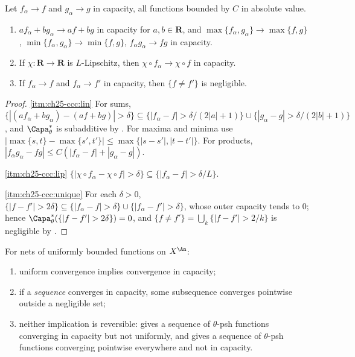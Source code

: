\begin{proposition}
\label{prop:ch25-capacity-convergence-calculus}
Let \(f_\alpha\to f\) and \(g_\alpha\to g\) in capacity, all functions
bounded by \(C\) in absolute value.
\begin{enumerate}
\item\label{itm:ch25-ccc:lin}
 \(af_\alpha+bg_\alpha\to af+bg\) in capacity for \(a,b\in\mathbf R\), and
 \(\max\{f_\alpha,g_\alpha\}\to\max\{f,g\}\),
 \(\min\{f_\alpha,g_\alpha\}\to\min\{f,g\}\),
 \(f_\alpha g_\alpha\to fg\) in capacity.
\item\label{itm:ch25-ccc:lip}
 If \(\chi:\mathbf R\to\mathbf R\) is \(L\)-Lipschitz, then
 \(\chi\circ f_\alpha\to\chi\circ f\) in capacity.
\item\label{itm:ch25-ccc:unique}
 If \(f_\alpha\to f\) and \(f_\alpha\to f'\) in capacity, then
 \(\{f\neq f'\}\) is negligible.
\end{enumerate}
\end{proposition}

\begin{proof}
\cref{itm:ch25-ccc:lin}  For sums, \(\{|(af_\alpha+bg_\alpha)-(af+bg)|
>\delta\}\subseteq\{|f_\alpha-f|>\delta/(2|a|+1)\}\cup
\{|g_\alpha-g|>\delta/(2|b|+1)\}\), and \(\Capa^*_\theta\) is subadditive by
.  For maxima and minima use
\(|\max\{s,t\}-\max\{s',t'\}|\leq\max\{|s-s'|,|t-t'|\}\).  For products,
\(|f_\alpha g_\alpha-fg|\leq C(|f_\alpha-f|+|g_\alpha-g|)\).

\cref{itm:ch25-ccc:lip}  \(\{|\chi\circ f_\alpha-\chi\circ f|>\delta\}
\subseteq\{|f_\alpha-f|>\delta/L\}\).

\cref{itm:ch25-ccc:unique}  For each \(\delta>0\),
\(\{|f-f'|>2\delta\}\subseteq\{|f_\alpha-f|>\delta\}\cup
\{|f_\alpha-f'|>\delta\}\), whose outer capacity tends to \(0\); hence
\(\Capa^*_\theta(\{|f-f'|>2\delta\})=0\), and
\(\{f\neq f'\}=\bigcup_k\{|f-f'|>2/k\}\) is negligible by
.
\end{proof}

\begin{proposition}
\label{prop:ch25-convergence-comparison}
For nets of uniformly bounded functions on \(X^{\An}\):
\begin{enumerate}
\item\label{itm:ch25-cc:unif}
 uniform convergence implies convergence in capacity;
\item\label{itm:ch25-cc:seq}
 if a \emph{sequence} converges in capacity, some subsequence converges
 pointwise outside a negligible set;
\item\label{itm:ch25-cc:none}
 neither implication is reversible: 
 gives a sequence of \(\theta\)-psh functions converging in capacity but not
 uniformly, and  gives a sequence of
 \(\theta\)-psh functions converging pointwise everywhere and not in
 capacity.
\end{enumerate}
\end{proposition}

